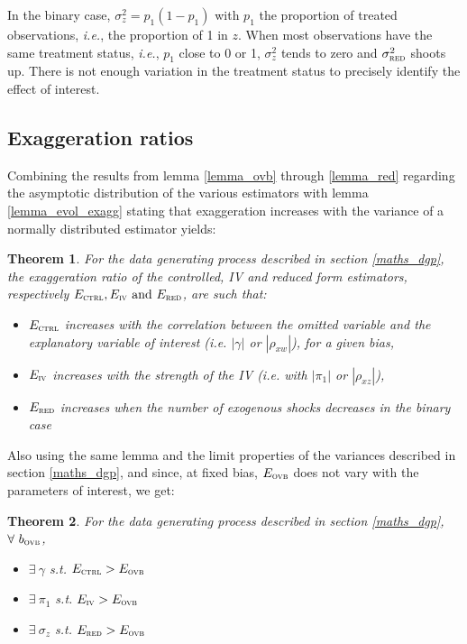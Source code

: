 \documentclass[usletter, 12pt]{article}
\newtheorem{theorem}{Theorem}
\begin{document}
				In the binary case, $\sigma_{z}^{2} = p_{1}(1-p_{1})$ with $p_{1}$ the proportion of treated observations, \textit{i.e.}, the proportion of 1 in $z$. When most observations have the same treatment status, \textit{i.e.}, $p_{1}$ close to 0 or 1, $\sigma_{z}^{2}$ tends to zero and $\sigma_{\textsc{red}}^{2}$ shoots up. There is not enough variation in the treatment status to precisely identify the effect of interest. 
				
		\subsection{Exaggeration ratios}
		
			Combining the results from lemma \ref{lemma_ovb} through \ref{lemma_red}  regarding the asymptotic distribution of the various estimators with lemma \ref{lemma_evol_exagg} stating that exaggeration increases with the variance of a normally distributed estimator yields:
			~
			\begin{theorem}
				For the data generating process described in section \ref{maths_dgp}, the exaggeration ratio of the controlled, IV and reduced form estimators, respectively $E_{\textsc{ctrl}}, E_{\textsc{iv}} \text{ and } E_{\textsc{red}}$, are such that:
					\begin{itemize}
						\item $E_{\textsc{ctrl}}$ increases with the correlation between the omitted variable and the explanatory variable of interest (\textit{i.e.} $|\gamma|$ or $|\rho_{xw}|$), for a given bias,
						\item $E_{\textsc{iv}}$ increases with the strength of the IV (\textit{i.e.} with $|\pi_{1}|$ or $|\rho_{xz}|$),
						\item $E_{\textsc{red}}$ increases when the number of exogenous shocks decreases in the binary case
					\end{itemize}
			\end{theorem}
			
			Also using the same lemma and the limit properties of the variances described in section \ref{maths_dgp}, and since, at fixed bias, $E_{\textsc{ovb}}$ does not vary with the parameters of interest, we get:
			~
			\begin{theorem}
				For the data generating process described in section \ref{maths_dgp}, $\forall \ b_{\textsc{ovb}}$,
					\begin{itemize}
						\item $\exists \ \gamma$ s.t. $E_{\textsc{ctrl}} > E_{\textsc{ovb}}$
						\item $\exists \ \pi_{1}$ s.t. $E_{\textsc{iv}} > E_{\textsc{ovb}}$
						\item $\exists \ \sigma_{z}$ s.t. $E_{\textsc{red}} > E_{\textsc{ovb}}$
					\end{itemize}
			\end{theorem}
			
\end{document}
